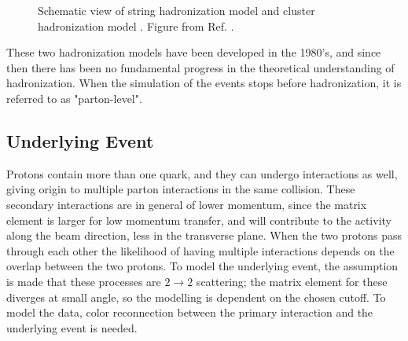 \begin{figure}[h]
\begin{center}
\end{center}
 \caption{Schematic view of string hadronization model  and cluster hadronization model . Figure from Ref. \cite{Isildak:2013kfa}.}
  \label{fig:had_model}
\end{figure}


These two hadronization models have been developed in the 1980's, and since then there has been no fundamental progress in the theoretical understanding of hadronization. 
When the simulation of the events stops before hadronization, it is referred to as "parton-level".

\subsection{Underlying Event}

Protons contain more than one quark, and they can undergo interactions as well, giving origin to multiple parton interactions in the same collision.
These secondary interactions are in general of lower momentum, since the matrix element is larger for low momentum transfer, and will contribute to the activity along the beam direction, less in the transverse plane. 
When the two protons pass through each other the likelihood of having multiple interactions depends on the overlap between the two protons. 
To model the underlying event, the assumption is made that these processes are $2\rightarrow2$ scattering; the matrix element for these diverges at small angle, so the modelling is dependent on the chosen \pt cutoff. 
To model the data, color reconnection between the primary interaction and the underlying event is needed. 

